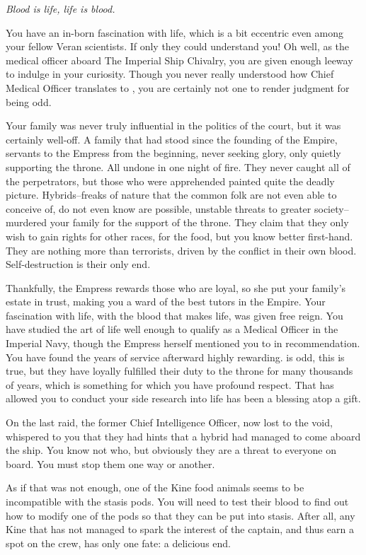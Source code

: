 \documentclass[char]{guildcamp4}
\begin{document}
\name{\cVthree{}}

\textit{Blood is life, life is blood.}

You have an in-born fascination with life, which is a bit eccentric even among your fellow Veran scientists. If only they could understand you! Oh well, as the medical officer aboard The Imperial Ship Chivalry, you are given enough leeway to indulge in your curiosity. Though you never really understood how Chief Medical Officer translates to \cVthree{\Baron}, you are certainly not one to render judgment for being odd.

Your family was never truly influential in the politics of the court, but it was certainly well-off. A family that had stood since the founding of the Empire, servants to the Empress from the beginning, never seeking glory, only quietly supporting the throne. All undone in one night of fire. They never caught all of the perpetrators, but those who were apprehended painted quite the deadly picture. Hybrids--freaks of nature that the common folk are not even able to conceive of, do not even know are possible, unstable threats to greater society--murdered your family for the support of the throne. They claim that they only wish to gain rights for other races, for the food, but you know better first-hand. They are nothing more than terrorists, driven by the conflict in their own blood. Self-destruction is their only end. 

Thankfully, the Empress rewards those who are loyal, so she put your family's estate in trust, making you a ward of the best tutors in the Empire. Your fascination with life, with the blood that makes life, was given free reign. You have studied the art of life well enough to qualify as a Medical Officer in the Imperial Navy, though the Empress herself mentioned you to \cVone{} in recommendation. You have found the years of service afterward highly rewarding. \cVone{} is odd, this is true, but they have loyally fulfilled their duty to the throne for many thousands of years, which is something for which you have profound respect. That \cVone{} has allowed you to conduct your side research into life has been a blessing atop a gift. 

On the last raid, the former Chief Intelligence Officer, now lost to the void, whispered to you that they had hints that a hybrid had managed to come aboard the ship. You know not who, but obviously they are a threat to everyone on board. You must stop them one way or another.

As if that was not enough, one of the Kine food animals seems to be incompatible with the stasis pods. You will need to test their blood to find out how to modify one of the pods so that they can be put into stasis. After all, any Kine that has not managed to spark the interest of the captain, and thus earn a spot on the crew, has only one fate: a delicious end. 
\end{document}
